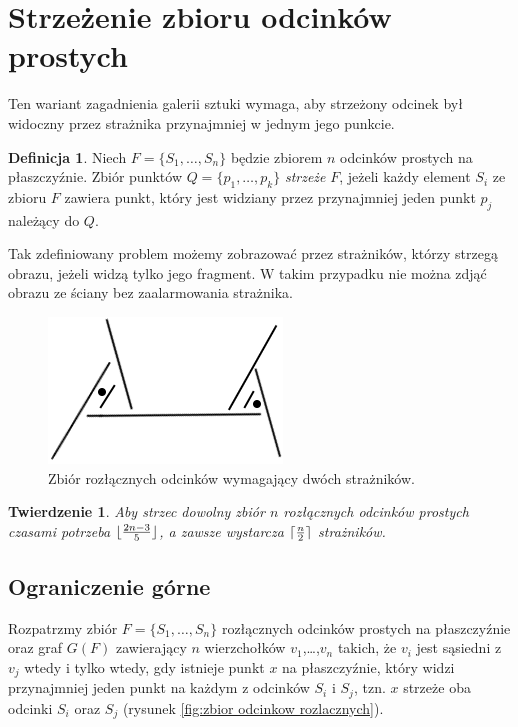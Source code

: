 \documentclass{xmgr}
\DeclarePairedDelimiter\ceil{\lceil}{\rceil}
\DeclarePairedDelimiter\floor{\lfloor}{\rfloor}
\newtheorem{Twierdzenie}{Twierdzenie}
\theoremstyle{definition}
\newtheorem{Definicja}{Definicja}
\begin{document}
\section{Strzeżenie zbioru odcinków prostych}\label{sec:strzezenie odcinkow}
Ten wariant zagadnienia galerii sztuki wymaga, aby strzeżony odcinek był widoczny przez strażnika przynajmniej w jednym jego punkcie. 
\begin{Definicja}
Niech $F = \{S_1,\ldots,S_n\}$ będzie zbiorem $n$ odcinków prostych na płaszczyźnie. Zbiór punktów $Q = \{p_1,\ldots,p_k\}$ \emph{strzeże} $F$, jeżeli każdy element $S_i$ ze zbioru $F$ zawiera punkt, który jest widziany przez przynajmniej jeden punkt $p_j$ należący do $Q$.
\end{Definicja}
Tak zdefiniowany problem możemy zobrazować przez strażników, którzy strzegą obrazu, jeżeli widzą tylko jego fragment. W takim przypadku nie można zdjąć obrazu ze ściany bez zaalarmowania strażnika.
\begin{figure}[ht!]
 \centering
  \includegraphics{rysunki/rozlaczny_dwoch_straznikow.png}
  \caption{Zbiór rozłącznych odcinków wymagający dwóch strażników.}
\end{figure} 

\begin{Twierdzenie} \label{straznicy strzezenie} \cite{illumination}
Aby strzec dowolny zbiór $n$ rozłącznych odcinków prostych czasami potrzeba $\floor{\frac{2n-3}{5}}$, a zawsze wystarcza $\ceil{\frac{n}{2}}$ strażników.
\end{Twierdzenie}

\subsection{Ograniczenie górne}
Rozpatrzmy zbiór $F =\{S_1,\ldots,S_n\}$ rozłącznych odcinków prostych na płaszczyźnie oraz graf $G(F)$ zawierający $n$ wierzchołków $v_1$,\ldots,$v_n$ takich, że $v_i$ jest sąsiedni z $v_j$ wtedy i tylko wtedy, gdy istnieje punkt $x$ na płaszczyźnie, który widzi przynajmniej jeden punkt na każdym z odcinków $S_i$ i $S_j$, tzn. $x$ strzeże oba odcinki $S_i$ oraz $S_j$ (rysunek \ref{fig:zbior odcinkow rozlacznych}).
\end{document}

